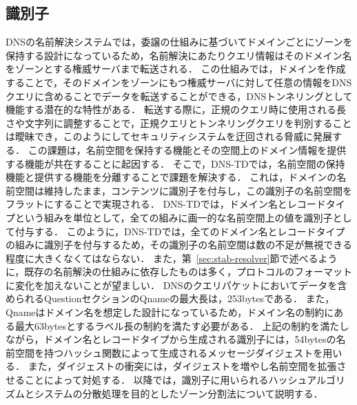 \subsection{識別子}
DNSの名前解決システムでは，委譲の仕組みに基づいてドメインごとにゾーンを保持する設計になっているため，名前解決にあたりクエリ情報はそのドメイン名をゾーンとする権威サーバまで転送される．
この仕組みでは，ドメインを作成することで，そのドメインをゾーンにもつ権威サーバに対して任意の情報をDNSクエリに含めることでデータを転送することができる，DNSトンネリングとして機能する潜在的な特性がある．
転送する際に，正規のクエリ時に使用される長さや文字列に調整することで，正規クエリとトンネリングクエリを判別することは曖昧でき，このようにしてセキュリティシステムを迂回される脅威に発展する．
この課題は，名前空間を保持する機能とその空間上のドメイン情報を提供する機能が共在することに起因する．
そこで，DNS-TDでは，名前空間の保持機能と提供する機能を分離することで課題を解決する．
これは，ドメインの名前空間は維持したまま，コンテンツに識別子を付与し，この識別子の名前空間をフラットにすることで実現される．
DNS-TDでは，ドメイン名とレコードタイプという組みを単位として，全ての組みに画一的な名前空間上の値を識別子として付与する．
このように，DNS-TDでは，全てのドメイン名とレコードタイプの組みに識別子を付与するため，その識別子の名前空間は数の不足が無視できる程度に大きくなくてはならない．
また，第~\ref{sec:stab-resolver}節で述べるように，既存の名前解決の仕組みに依存したものは多く，プロトコルのフォーマットに変化を加えないことが望ましい．
DNSのクエリパケットにおいてデータを含められるQuestionセクションのQnameの最大長は，253bytesである．
また，Qnameはドメイン名を想定した設計になっているため，ドメイン名の制約にある最大63bytesとするラベル長の制約を満たす必要がある．
上記の制約を満たしながら，ドメイン名とレコードタイプから生成される識別子には，54bytesの名前空間を持つハッシュ関数によって生成されるメッセージダイジェストを用いる．
また，ダイジェストの衝突には，ダイジェストを増やし名前空間を拡張させることによって対処する．
以降では，識別子に用いられるハッシュアルゴリズムとシステムの分散処理を目的としたゾーン分割法について説明する．

